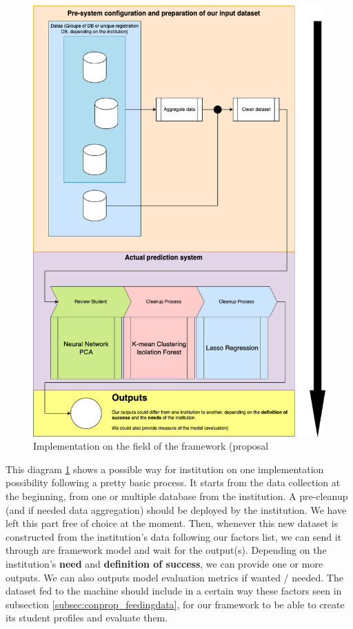 \documentclass[../main.tex]{subfiles}
\begin{document}
\begin{figure}
    \centering
    \includegraphics[width=1\linewidth]{res//diagram/Fonc imp.png}
    \caption{Implementation on the field of the framework (proposal}
    \label{fig:imp_fonc}
\end{figure}

This diagram \ref{fig:imp_fonc} shows a possible way for institution on one implementation possibility following a pretty basic process. It starts from the data collection at the beginning, from one or multiple database from the institution. A pre-cleanup (and if needed data aggregation) should be deployed by the institution. We have left this part free of choice at  the moment.
Then, whenever this new dataset is constructed from the institution's data following our factors list, we can send it through are framework model and wait for the output(s). Depending on the institution's \textbf{need} and \textbf{definition of success}, we can provide one or more outputs. We can also outputs model evaluation metrics if wanted / needed. 
The dataset fed to the machine should include in a certain way these factors seen in subsection \ref{subsec:conprop_feedingdata}, for our framework to be able to create its student profiles and evaluate them.
\end{document}
